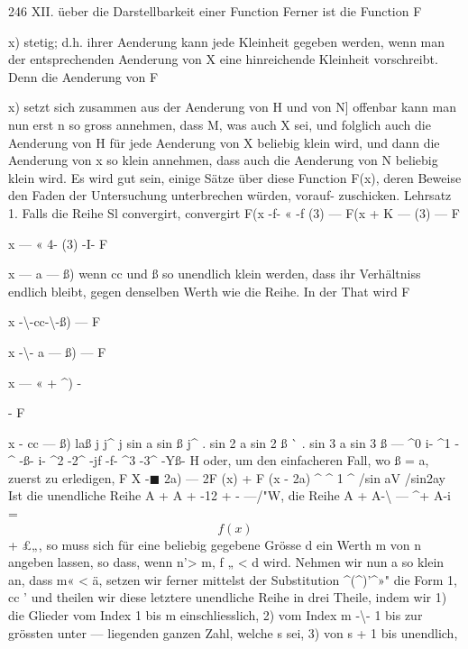 \documentclass[12pt,a4paper]{book}
\theoremstyle{definition}
\theoremstyle{remark}
\begin{document}
{{{{{{{%
246  XII.   üeber  die  Darstellbarkeit  einer  Function
Ferner  ist  die  Function  F{x)  stetig;  d.h.  ihrer  Aenderung  kann  jede
Kleinheit  gegeben  werden,  wenn  man  der  entsprechenden  Aenderung
von  X  eine  hinreichende  Kleinheit  vorschreibt.  Denn  die  Aenderung
von  F{x)  setzt  sich  zusammen  aus  der  Aenderung  von  H  und  von  N]
offenbar  kann  man  nun  erst  n  so  gross  annehmen,  dass  M,  was  auch
X  sei,  und  folglich  auch  die  Aenderung  von  H  für  jede  Aenderung
von  X  beliebig  klein  wird,  und  dann  die  Aenderung  von  x  so  klein
annehmen,  dass  auch  die  Aenderung  von  N  beliebig  klein  wird.
Es  wird  gut  sein,  einige  Sätze  über  diese  Function  F(x),  deren
Beweise  den  Faden  der  Untersuchung  unterbrechen  würden,  vorauf-
zuschicken.
Lehrsatz  1.     Falls  die  Reihe  Sl  convergirt,  convergirt
F(x  -f-  «  -f  (3)  ---  F(x  +  K  ---  (3)  ---  F{x  ---  «  4-  (3)  -I-  F{x  ---  a  ---  ß)
wenn  cc  und  ß  so  unendlich  klein  werden,  dass  ihr  Verhältniss  endlich
bleibt,  gegen  denselben  Werth  wie  die  Reihe.
In  der  That  wird
F{x  -\textbackslash{}-cc-\textbackslash{}-ß)  ---  F{x  -\textbackslash{}-  a  ---  ß)  ---  F{x  ---  «  +  ^)  -{-  F {x  -  cc  ---  ß)
laß
j     j^    j    sin  a  sin  ß  j^     .    sin  2  a  sin  2  ß  ^^     .    sin  3  a  sin  3  ß
---  ^0  i-  ^1  -^  -ß-  i-  ^2  -2^  -jf  -f-  ^3  -3^  -Yß-  H
oder,  um  den  einfacheren  Fall,  wo  ß  =  a,  zuerst  zu  erledigen,
F  {X  -}$\blacksquare$  2a)  ---  2F  (x)  +  F  (x  -  2a)  ^  ^      1    ^    /sin  aV  /sin2ay
Ist  die  unendliche  Reihe
A  +  A  +  -12  +  -  ---/"W,
die  Reihe
A  +  A-\textbackslash{} --- ^+  A-i  =  $$f(x)$$  +  \pounds„,
so  muss  sich  für  eine  beliebig  gegebene  Grösse  d  ein  Werth  m  von  n
angeben  lassen,  so  dass,  wenn  n'>  m,  f „  <  d  wird.  Nehmen  wir  nun
a  so  klein  an,  dass  m«  <  ä,  setzen  wir  ferner  mittelst  der  Substitution
^(^)'^»"  die  Form
1,  cc  '
und  theilen  wir  diese  letztere  unendliche  Reihe  in  drei  Theile,  indem  wir
1)  die  Glieder  vom  Index  1  bis  m  einschliesslich,
2)  vom  Index  m  -\textbackslash{}-  1   bis  zur  grössten  unter  ---  liegenden  ganzen
Zahl,  welche  s  sei,
3)  von  s  +  1  bis  unendlich,
\newpage

}}}}}}}}}}}}}}}}
\end{document}
